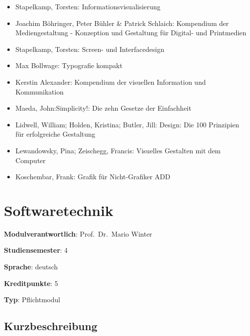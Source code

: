 \begin{itemize}
\tightlist
\item
  Stapelkamp, Torsten: Informationsvisualisierung
\item
  Joachim Böhringer, Peter Bühler \& Patrick Schlaich: Kompendium der
  Mediengestaltung - Konzeption und Gestaltung für Digital- und
  Printmedien
\item
  Stapelkamp, Torsten: Screen- und Interfacedesign
\item
  Max Bollwage: Typografie kompakt
\item
  Kerstin Alexander: Kompendium der visuellen Information und
  Kommunikation
\item
  Maeda, John:Simplicity!: Die zehn Gesetze der Einfachheit
\item
  Lidwell, William; Holden, Kristina; Butler, Jill: Design: Die 100
  Prinzipien für erfolgreiche Gestaltung
\item
  Lewandowsky, Pina; Zeischegg, Francis: Visuelles Gestalten mit dem
  Computer
\item
  Koschembar, Frank: Grafik für Nicht-Grafiker ADD
\end{itemize}

\hypertarget{softwaretechnikpathlabelmi-2017modulbeschreibungen-bachelorba_softwaretechnik}{%
\chapter{Softwaretechnik\label{/mi-2017/modulbeschreibungen-bachelor/BA_Softwaretechnik}}\label{softwaretechnikpathlabelmi-2017modulbeschreibungen-bachelorba_softwaretechnik}}

\begin{modulHead}
\textbf{Modulverantwortlich}: Prof.~Dr.~Mario
Winter
\end{modulHead}
\begin{modulHead}
\textbf{Studiensemester}:
4
\end{modulHead}
\begin{modulHead}
\textbf{Sprache}:
deutsch
\end{modulHead}
\begin{modulHead}
\textbf{Kreditpunkte}:
5
\end{modulHead}
\begin{modulHead}
\textbf{Typ}:
Pflichtmodul
\end{modulHead}


\hypertarget{kurzbeschreibungpathlabelmi-2017modulbeschreibungen-bachelorba_softwaretechnik}{%
\section*{Kurzbeschreibung\label{/mi-2017/modulbeschreibungen-bachelor/BA_Softwaretechnik}}\label{kurzbeschreibungpathlabelmi-2017modulbeschreibungen-bachelorba_softwaretechnik}}

